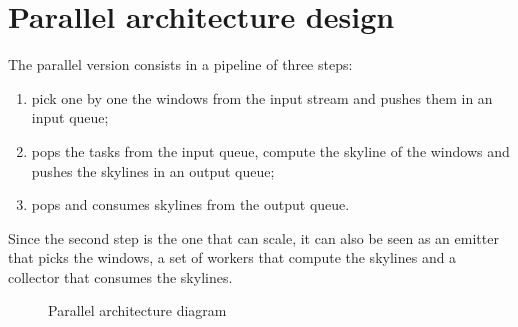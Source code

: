 \section{Parallel architecture design}

The parallel version consists in a pipeline of three steps:
\begin{enumerate}
    \item pick one by one the windows from the input stream and pushes them in an input queue;
    \item pops the tasks from the input queue, compute the skyline of the windows and pushes the skylines in an output queue;
    \item pops and consumes skylines from the output queue.
\end{enumerate}

\noindent
Since the second step is the one that can scale, it can also be seen as an emitter that picks the windows, a set of workers that compute the skylines and a collector that consumes the skylines.

\bigskip\noindent
\begin{figure}[h]
    \centering
    
    \bigskip
    \caption{Parallel architecture diagram}
    \label{fig:parallel_diagram}
\end{figure}
